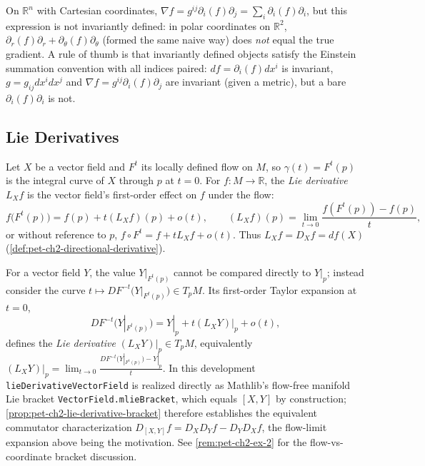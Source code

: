 \begin{remark}
  \label{rem:pet-ch2-gradient-not-invariant}
  \leanok
  On $\mathbb{R}^n$ with Cartesian coordinates, $\nabla f=g^{ij}\partial_i(f)\partial_j=\sum_i\partial_i(f)\partial_i$,
  but this expression is not invariantly defined: in polar coordinates on
  $\mathbb{R}^2$, $\partial_r(f)\partial_r+\partial_\theta(f)\partial_\theta$ (formed the same naive way) does
  \emph{not} equal the true gradient. A rule of thumb is that invariantly
  defined objects satisfy the Einstein summation convention with all indices
  paired: $df=\partial_i(f)dx^i$ is invariant, $g=g_{ij}dx^idx^j$ and
  $\nabla f=g^{ij}\partial_i(f)\partial_j$ are invariant (given a metric), but a bare
  $\partial_i(f)\partial_i$ is not.
\end{remark}

\subsection{Lie Derivatives}

\begin{definition}
  \label{def:pet-ch2-lie-derivative-function}
  \leanok
  Let $X$ be a vector field and $F^t$ its locally defined flow on $M$, so
  $\gamma(t)=F^t(p)$ is the integral curve of $X$ through $p$ at $t=0$. For
  $f:M\to\mathbb{R}$, the \emph{Lie derivative} $L_Xf$ is the vector field's first-order
  effect on $f$ under the flow:
  \[
    f\big(F^t(p)\big)=f(p)+t(L_Xf)(p)+o(t),
    \qquad
    (L_Xf)(p)=\lim_{t\to0}\frac{f(F^t(p))-f(p)}{t},
  \]
  or without reference to $p$, $f\circ F^t=f+tL_Xf+o(t)$. Thus $L_Xf=D_Xf=df(X)$
  (\cref{def:pet-ch2-directional-derivative}).
\end{definition}

\begin{definition}
  \label{def:pet-ch2-lie-derivative-vector-field}
  \leanok
  For a vector field $Y$, the value $Y|_{F^t(p)}$ cannot be compared directly to
  $Y|_p$; instead consider the curve $t\mapsto DF^{-t}\big(Y|_{F^t(p)}\big)\in T_pM$.
  Its first-order Taylor expansion at $t=0$,
  \[
    DF^{-t}\big(Y|_{F^t(p)}\big)=Y|_p+t(L_XY)|_p+o(t),
  \]
  defines the \emph{Lie derivative} $(L_XY)|_p\in T_pM$, equivalently
  $(L_XY)|_p=\lim_{t\to0}\frac{DF^{-t}(Y|_{F^t(p)})-Y|_p}{t}$.
  In this development \texttt{lieDerivativeVectorField} is realized directly as
  Mathlib's flow-free manifold Lie bracket \texttt{VectorField.mlieBracket},
  which equals $[X,Y]$ by construction; \cref{prop:pet-ch2-lie-derivative-bracket}
  therefore establishes the equivalent commutator characterization
  $D_{[X,Y]}f=D_XD_Yf-D_YD_Xf$, the flow-limit expansion above being the
  motivation. See \cref{rem:pet-ch2-ex-2} for the flow-vs-coordinate bracket
  discussion.
\end{definition}

